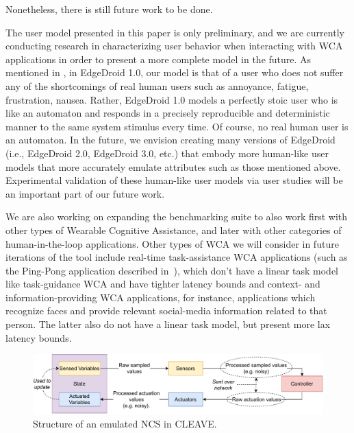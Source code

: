 Nonetheless, there is still future work to be done.

The user model presented in this paper is only preliminary, and we are currently conducting research in characterizing user behavior when interacting with WCA applications in order to present a more complete model in the future.
As mentioned in , in EdgeDroid 1.0, our model is that of a user who does not suffer any of the shortcomings of real human users such as annoyance, fatigue, frustration, nausea.
Rather, EdgeDroid 1.0 models a perfectly stoic user who is like an automaton and responds in a precisely reproducible and deterministic manner to the same system stimulus every time.
Of course, no real human user is an automaton.
In the future, we envision creating  many versions of EdgeDroid (i.e., EdgeDroid 2.0, EdgeDroid 3.0, etc.) that embody more human-like user models that more accurately emulate attributes such as those mentioned above.
Experimental validation of these human-like user models via user studies will be an important part of our future work.

We are also working on expanding the benchmarking suite to also work first with other types of Wearable Cognitive Assistance, and later with other categories of human-in-the-loop applications.
Other types of WCA we will consider in future iterations of the tool include real-time task-assistance WCA applications (such as the Ping-Pong application described in~\cite{Chen:EarlyImplementation}), which don't have a linear task model like task-guidance WCA and have tighter latency bounds and context- and information-providing WCA applications, for instance, applications which recognize faces and provide relevant social-media information related to that person.
The latter also do not have a linear task model, but present more lax latency bounds.


\begin{figure}
    \centering
    \includegraphics[width=.8\textwidth]{publications/2022CLEAVE/images/CLEAVE_NCS_structure}
    \caption{
        Structure of an emulated \acl*{NCS} in \acs*{CLEAVE}.
    }\label{fig:cleave:ncs:struct}
\end{figure}

